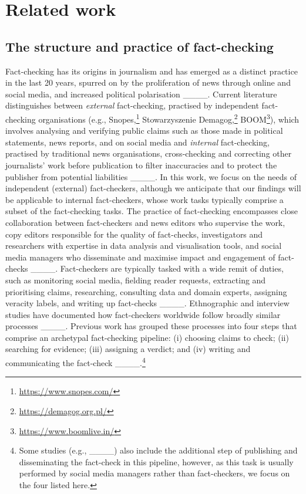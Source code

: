 \section{Related work}
\label{relwork}

\subsection{The structure and practice of fact-checking} \label{relwork:factchecking}
Fact-checking has its origins in journalism and has emerged as a distinct practice in the last 20 years, spurred on by the proliferation of news through online and social media, and increased political polarisation ____.
Current literature distinguishes between
\textit{external} fact-checking, practised by independent fact-checking organisations 
(e.g., Snopes,\footnote{\url{https://www.snopes.com/}} Stowarzyszenie Demagog,\footnote{\url{https://demagog.org.pl/}} BOOM\footnote{\url{https://www.boomlive.in/}}), which involves analysing and verifying public claims such as those made in political statements, news reports, and on social media and
\textit{internal} fact-checking, practised by traditional news organisations, cross-checking and correcting other journalists' work before publication to filter inaccuracies and to protect the publisher from potential liabilities
____.
In this work, we focus on the needs of independent (external) fact-checkers, although we anticipate that our findings will be applicable to internal fact-checkers, whose work tasks typically comprise a subset of the fact-checking tasks.
The practice of fact-checking encompasses close collaboration between fact-checkers and news editors who supervise the work, copy editors responsible for the quality of fact-checks, investigators and researchers with expertise in data analysis and visualisation tools, and social media managers who disseminate and maximise impact and engagement of fact-checks ____. 
Fact-checkers are typically tasked with a wide remit of duties, such as monitoring social media, fielding reader requests, extracting and prioritising claims, researching, consulting data and domain experts, assigning veracity labels, and writing up fact-checks ____.
Ethnographic and interview studies have documented how fact-checkers worldwide follow broadly similar processes ____.
Previous work has grouped these processes into four steps that comprise an archetypal fact-checking pipeline: (i) choosing claims to check; (ii) searching for evidence; (iii) assigning a verdict; and (iv) writing and communicating the fact-check ____.\footnote{Some studies (e.g., ____) also include the additional step of publishing and disseminating the fact-check in this pipeline, however, as this task is usually performed by social media managers rather than fact-checkers, we focus on the four listed here.}

